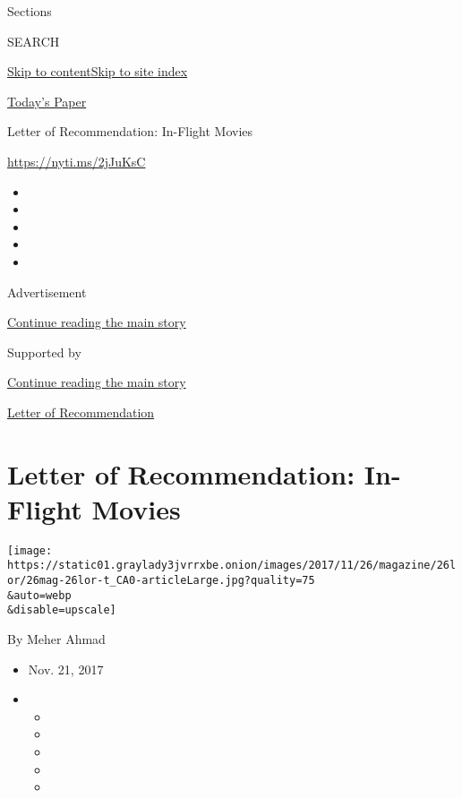 Sections

SEARCH

\protect\hyperlink{site-content}{Skip to
content}\protect\hyperlink{site-index}{Skip to site index}

\href{https://myaccount.nytimes3xbfgragh.onion/auth/login?response_type=cookie\&client_id=vi}{}

\href{https://www.nytimes3xbfgragh.onion/section/todayspaper}{Today's
Paper}

Letter of Recommendation: In-Flight Movies

\url{https://nyti.ms/2jJuKsC}

\begin{itemize}
\item
\item
\item
\item
\item
\end{itemize}

Advertisement

\protect\hyperlink{after-top}{Continue reading the main story}

Supported by

\protect\hyperlink{after-sponsor}{Continue reading the main story}

\href{/column/letter-of-recommendation}{Letter of Recommendation}

\hypertarget{letter-of-recommendation-in-flight-movies}{%
\section{Letter of Recommendation: In-Flight
Movies}\label{letter-of-recommendation-in-flight-movies}}

\texttt{[image: https://static01.graylady3jvrrxbe.onion/images/2017/11/26/magazine/26lor/26mag-26lor-t\_CA0-articleLarge.jpg?quality=75\\\&auto=webp\\\&disable=upscale]}

By Meher Ahmad

\begin{itemize}
\item
  Nov. 21, 2017
\item
  \begin{itemize}
  \item
  \item
  \item
  \item
  \item
  \end{itemize}
\end{itemize}

